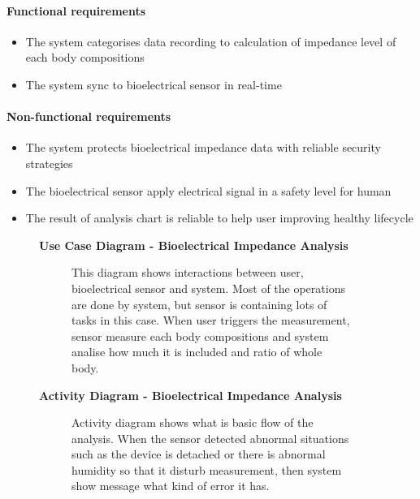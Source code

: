 \documentclass{article}
\begin{document}
		\paragraph{Functional requirements}
		\begin{itemize}
			\item The system categorises data recording to calculation of impedance level of each body compositions
			\item The system sync to bioelectrical sensor in real-time
		\end{itemize}
		
		\paragraph{Non-functional requirements}
		\begin{itemize}
			\item The system protects bioelectrical impedance data with reliable security strategies
			\item The bioelectrical sensor apply electrical signal in a safety level for human
			\item The result of analysis chart is reliable to help user improving healthy lifecycle
		\end{itemize}
		\newpage
		
		\begin{figure}[htbp]
			\textbf{Use Case Diagram - Bioelectrical Impedance Analysis}
			\centering
			\begin{subfigure}{\textwidth}
				\resizebox{\textwidth}{!}{}
			\end{subfigure}
			\begin{subfigure}{\textwidth}
				This diagram shows interactions between user, bioelectrical sensor and system. Most of the operations are done by system, but sensor is containing lots of tasks in this case. When user triggers the measurement, sensor measure each body compositions and system analise how much it is included and ratio of whole body.
			\end{subfigure}
		\end{figure}
		\clearpage
		
		\begin{figure}[htbp]
			\textbf{Activity Diagram - Bioelectrical Impedance Analysis}
			\centering
			\begin{subfigure}{\textwidth}
				\centering
				\scalebox{1.0}{}
			\end{subfigure}
			\begin{subfigure}{\textwidth}
				Activity diagram shows what is basic flow of the analysis. When the sensor detected abnormal situations such as the device is detached or there is abnormal humidity so that it disturb measurement, then system show message what kind of error it has.
			\end{subfigure}
		\end{figure}
		\clearpage
		
\end{document}
